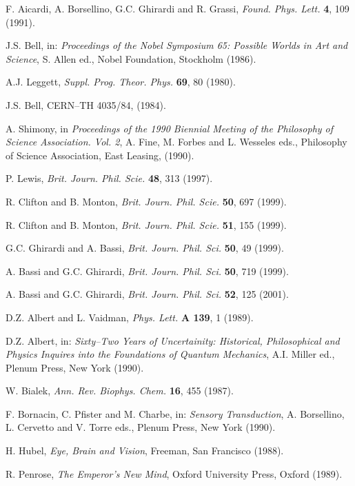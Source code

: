 \documentclass[12pt]{article}
\begin{document}
\begin{thebibliography}{999}
 F. Aicardi, A. Borsellino, G.C. Ghirardi and R.
Grassi, {\it Found. Phys. Lett.} {\bf 4}, 109 (1991).

 J.S. Bell, in: {\it Proceedings of the Nobel
Symposium 65: Possible Worlds in Art and Science}, S. Allen ed.,
Nobel Foundation, Stockholm (1986).

 A.J. Leggett, {\it Suppl. Prog. Theor. Phys.}
{\bf 69}, 80 (1980).

 J.S. Bell, CERN--TH 4035/84, (1984).

 A. Shimony, in {\it Proceedings of the 1990
Biennial Meeting of the Philosophy of Science Association. Vol.
2}, A. Fine, M. Forbes and L. Wesseles eds., Philosophy of Science
Association, East Leasing, (1990).

 P. Lewis, {\it Brit. Journ. Phil. Scie.} {\bf 48},
313 (1997).

 R. Clifton and B. Monton, {\it Brit. Journ. Phil.
Scie.} {\bf 50}, 697 (1999).

 R. Clifton and B. Monton, {\it Brit. Journ. Phil.
Scie.} {\bf 51}, 155 (1999).

 G.C. Ghirardi and A. Bassi, {\it Brit. Journ.
Phil. Sci.} {\bf 50}, 49 (1999).

 A. Bassi and G.C. Ghirardi, {\it Brit. Journ.
Phil. Sci.} {\bf 50}, 719 (1999).

 A. Bassi and G.C. Ghirardi, {\it Brit. Journ.
Phil. Sci.} {\bf 52}, 125 (2001).

 D.Z. Albert and L. Vaidman, {\it Phys. Lett.} {\bf A
139}, 1 (1989).

 D.Z. Albert, in: {\it Sixty--Two Years of
Uncertainity: Historical, Philosophical and Physics Inquires into
the Foundations of Quantum Mechanics}, A.I. Miller ed., Plenum
Press, New York (1990).

 W. Bialek, {\it Ann. Rev. Biophys. Chem.} {\bf 16},
455 (1987).

 F. Bornacin, C. Pfister and M. Charbe, in: {\it
Sensory Transduction}, A. Borsellino, L. Cervetto and V. Torre
eds., Plenum Press, New York (1990).

 H. Hubel, {\it Eye, Brain and Vision}, Freeman, San
Francisco (1988).

 R. Penrose, {\it The Emperor's New Mind}, Oxford
University Press, Oxford (1989).


\end{thebibliography}
\end{document}
